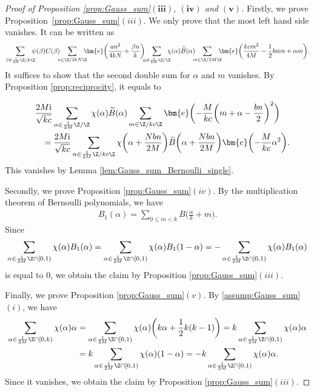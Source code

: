 \begin{proof}[Proof of Proposition \ref{prop:Gauss_sum}${\boldsymbol{(iii)}}$, $\boldsymbol{(iv)}$ and $\boldsymbol{(v)}$]
	Firstly, we prove Proposition~\ref{prop:Gauss_sum}$(iii)$.
	We on\-ly prove that the most left hand side vanishes.
	It can be written as
	\begin{gather*}
		\sum_{\beta \in \frac{1}{2N}\Z/k\Z}\!\!\!\! \psi(\beta) C(\beta)\!\!\!
		\sum_{n \in \Z/2kN\Z}\!\!\! \!\bm{e}\bigg( \frac{an^2}{4kN} + \frac{\beta n}{k} \bigg)
	\!\!\!\sum_{\alpha \in \frac{1}{2M}\Z/\Z}\!\!\! \!\chi(\alpha) \widetilde{B}(\alpha)\!\!\!
\sum_{m \in \Z/2M\Z}\!\!\!\!\bm{e}\bigg( \frac{kcm^2}{4M} - \frac{1}{2}bmn + \alpha m \bigg).
	\end{gather*}
	It suffices to show that the second double sum for $ \alpha $ and $ m $ vanishes.
	By Proposition \ref{prop:reciprocity}, it equals to
	{\samepage\begin{gather*}
\frac{2M{\rm i}}{\sqrt{kc}}
		\sum_{\alpha \in \frac{1}{2M}\Z/\Z} \chi(\alpha) \widetilde{B}(\alpha)
		\sum_{m \in \Z/kc\Z} \bm{e}\bigg({-}\frac{M}{kc} \bigg( m + \alpha - \frac{bn}{2} \bigg)^2 \bigg)
\\ \qquad
	{}=	\frac{2M{\rm i}}{\sqrt{kc}}
		\sum_{\alpha \in \frac{1}{2M}\Z/kc\Z} \chi\bigg(\alpha + \frac{Nbn}{2M} \bigg) \widetilde{B}\bigg(\alpha + \frac{Nbn}{2M} \bigg)
		\bm{e}\bigg({-}\frac{M}{kc} \alpha^2 \bigg).
	\end{gather*}
	This vanishes by Lemma \ref{lem:Gauss_sum_Bernoulli_single}.

}
	
	Secondly, we prove Proposition \ref{prop:Gauss_sum}$(iv)$.
	By the multiplication theorem of Bernoulli polynomials, we have
	\begin{gather*}
	B_1(\alpha) = \sum_{0 \le m < k} B\bigg( \frac{\alpha}{k} + m \bigg).
	\end{gather*}
	Since
	\begin{gather*}
	\sum_{\alpha \in \frac{1}{2M}\Z \cap [0, 1)} \chi(\alpha) B_1(\alpha)
	= \sum_{\alpha \in \frac{1}{2M}\Z \cap [0, 1)} \chi(\alpha) B_1(1-\alpha)
	= -\sum_{\alpha \in \frac{1}{2M}\Z \cap [0, 1)} \chi(\alpha) B_1(\alpha)
	\end{gather*}
	is equal to $ 0 $, we obtain the claim by Proposition \ref{prop:Gauss_sum}$(iii)$.
	
	Finally, we prove Proposition \ref{prop:Gauss_sum}$(v)$.
	By \ref{assump:Gauss_sum}$(i)$, we have
	\begin{align*}
		\sum_{\alpha \in \frac{1}{2M}\Z \cap [0, k)} \chi(\alpha) \alpha		&=
\sum_{\alpha \in \frac{1}{2M}\Z \cap [0, 1)} \chi(\alpha) \bigg( k\alpha + \frac{1}{2}k(k-1) \bigg)
		= 		k \sum_{\alpha \in \frac{1}{2M}\Z \cap [0, 1)} \chi(\alpha) \alpha
\\
		&= k \sum_{\alpha \in \frac{1}{2M}\Z \cap [0, 1)} \chi(\alpha) ( 1 - \alpha )
		= -k \sum_{\alpha \in \frac{1}{2M}\Z \cap [0, 1)} \chi(\alpha) \alpha.
	\end{align*}
	Since it vanishes, we obtain the claim by Proposition \ref{prop:Gauss_sum}$(iii)$.
\end{proof}

